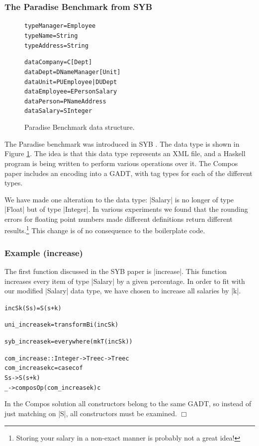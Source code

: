 \documentclass[preprint]{sigplanconf}
\newcounter{exmp}
\newcommand{\noexample}{\hfill$\Box$}
\newenvironment{code}{\begin{alltt}\small}{\end{alltt}}
\newenvironment{examplename}[1]
    {\subsubsection*{Example \arabic{exmp} (#1)}\refstepcounter{exmp}}
    {\noexample}
\newcommand{\ignore}{}
\begin{document}
\subsubsection{The Paradise Benchmark from SYB}

\begin{figure}
\begin{code}
type Manager   = Employee
type Name      = String
type Address   = String

data Company   = C [Dept]
data Dept      = D Name Manager [Unit]
data Unit      = PU Employee | DU Dept
data Employee  = E Person Salary
data Person    = P Name Address
data Salary    = S Integer
\end{code}
\caption{Paradise Benchmark data structure.}
\label{fig:paradise}
\end{figure}

The Paradise benchmark was introduced in SYB \citep{lammel:syb}. The data type is shown in Figure \ref{fig:paradise}. The idea is that this data type represents an XML file, and a Haskell program is being written to perform various operations over it. The Compos paper includes an encoding into a GADT, with tag types for each of the different types.

We have made one alteration to the data type: |Salary| is no longer of type |Float| but of type |Integer|. In various experiments we found that the rounding errors for floating point numbers made different definitions return different results.\footnote{Storing your salary in a non-exact manner is probably not a great idea!} This change is of no consequence to the boilerplate code.

\begin{examplename}{increase}

The first function discussed in the SYB paper is |increase|. This function increases every item of type |Salary| by a given percentage. In order to fit with our modified |Salary| data type, we have chosen to increase all salaries by |k|.

\ignore\begin{code}
incS k (S s) = S (s + k)

uni_increase k = transformBi (incS k)

syb_increase k = everywhere (mkT (incS k))

com_increase :: Integer -> Tree c -> Tree c
com_increase k c = case c of
    S s -> S (s + k)
    _ -> composOp (com_increase k) c
\end{code}

In the Compos solution all constructors belong to the same GADT, so instead of just matching on |S|, all constructors must be examined.
\end{examplename}
\end{document}
